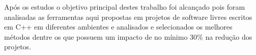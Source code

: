	Após os estudos o objetivo principal destes trabalho foi alcançado pois foram
 analisadas as ferramentas aqui propostas em projetos de software livres escritos em C++ 
em diferentes ambientes e analisados e selecionados os melhores métodos dentre os que possuem
um impacto de no mínimo 30\% na redução dos projetos.
